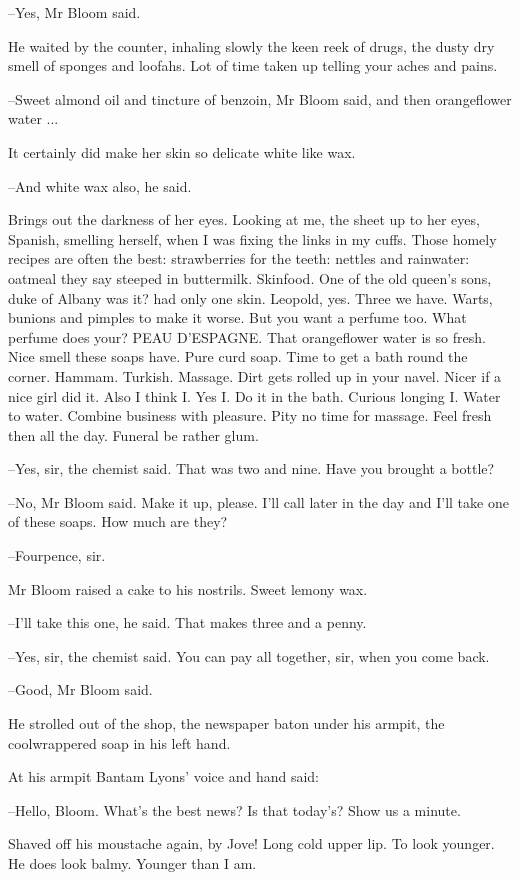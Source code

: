 --Yes, Mr Bloom said.

He waited by the counter, inhaling slowly the keen reek of drugs, the
dusty dry smell of sponges and loofahs. Lot of time taken up telling your
aches and pains.

--Sweet almond oil and tincture of benzoin, Mr Bloom said, and then
orangeflower water ...

It certainly did make her skin so delicate white like wax.

--And white wax also, he said.

Brings out the darkness of her eyes. Looking at me, the sheet up to
her eyes, Spanish, smelling herself, when I was fixing the links in my
cuffs. Those homely recipes are often the best: strawberries for the
teeth: nettles and rainwater: oatmeal they say steeped in buttermilk.
Skinfood. One of the old queen's sons, duke of Albany was it? had only one
skin. Leopold, yes. Three we have. Warts, bunions and pimples to make it
worse. But you want a perfume too. What perfume does your? PEAU D'ESPAGNE.
That orangeflower water is so fresh. Nice smell these soaps have. Pure
curd soap. Time to get a bath round the corner. Hammam. Turkish. Massage.
Dirt gets rolled up in your navel. Nicer if a nice girl did it. Also I
think I. Yes I. Do it in the bath. Curious longing I. Water to water.
Combine business with pleasure. Pity no time for massage. Feel fresh then
all the day. Funeral be rather glum.

--Yes, sir, the chemist said. That was two and nine. Have you brought a
bottle?

--No, Mr Bloom said. Make it up, please. I'll call later in the day and
I'll take one of these soaps. How much are they?

--Fourpence, sir.

Mr Bloom raised a cake to his nostrils. Sweet lemony wax.

--I'll take this one, he said. That makes three and a penny.

--Yes, sir, the chemist said. You can pay all together, sir, when you
come back.

--Good, Mr Bloom said.

He strolled out of the shop, the newspaper baton under his armpit,
the coolwrappered soap in his left hand.

At his armpit Bantam Lyons' voice and hand said:

--Hello, Bloom. What's the best news? Is that today's? Show us a minute.

Shaved off his moustache again, by Jove! Long cold upper lip. To
look younger. He does look balmy. Younger than I am.

